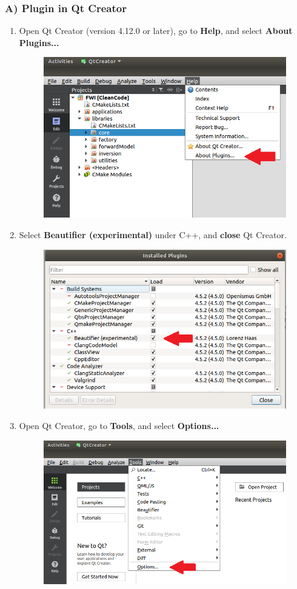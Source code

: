 \documentclass[10pt]{article}
\begin{document}
\subsubsection*{A) Plugin in Qt Creator}
\begin{enumerate}
\item Open Qt Creator (version 4.12.0 or later), go to \textbf{Help}, and select \textbf{About Plugins...}
\begin{figure}[h!]
\centering
\includegraphics[width=0.6 \textwidth]{clang-format1.png}
\end{figure}

\newpage

\item Select \textbf{Beautifier (experimental)} under C++, and \textbf{close} Qt Creator.
\begin{figure}[h]
\centering
\includegraphics[width=0.6 \textwidth]{clang-format2.png}
\end{figure}

\item Open Qt Creator, go to \textbf{Tools}, and select \textbf{Options...}
\begin{figure}[h!]
\centering
\includegraphics[width=0.6 \textwidth]{clang-format3.png}
\end{figure}


\end{enumerate}
\end{document}
